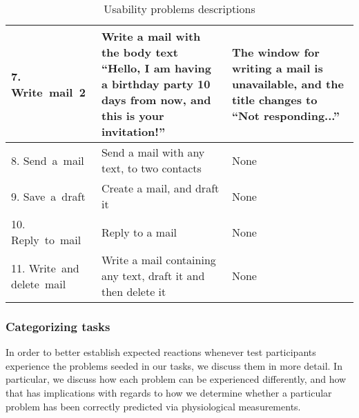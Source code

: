 \begin{table}[h]
\begin{tabular}[c]{|p{60pt}|p{80pt}|p{80pt}|}
    \small{7. Write~mail~2}           & \small{Write a mail with the body text ``Hello, I am having a birthday party 10 days from now, and this is your invitation!''} & \small{The window for writing a mail is unavailable, and the title changes to ``Not responding...''}                                                \\ \hline
    \small{8. Send~a~mail}            & \small{Send a mail with any text, to two contacts}                                                                             & \small{None}                                                                                                                                        \\ \hline
    \small{9. Save~a~draft}           & \small{Create a mail, and draft it}                                                                                            & \small{None}                                                                                                                                        \\ \hline
    \small{10. Reply~to~mail}         & \small{Reply to a mail}                                                                                                        & \small{None}                                                                                                                                        \\ \hline
    \small{11. Write~and delete~mail} & \small{Write a mail containing any text, draft it and then delete it}                                                          & \small{None}                                                                                                                                        \\ \hline
  \end{tabular}
  \caption{Usability problems descriptions}
  \label{tab:ups-desc}
\end{table}

\subsubsection{Categorizing tasks}
In order to better establish expected reactions whenever test participants experience the problems seeded in our tasks,
we discuss them in more detail. In particular, we discuss how each problem can be experienced differently, and how that
has implications with regards to how we determine whether a particular problem has been correctly predicted via physiological
measurements.

